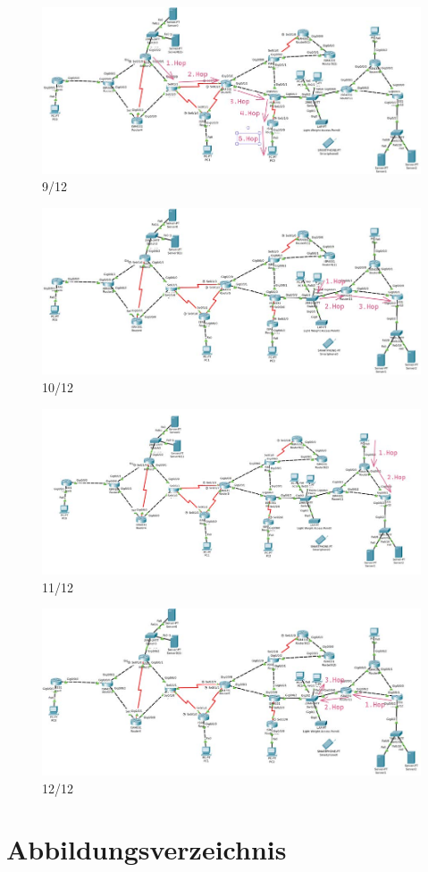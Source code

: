 \documentclass[a4paper]{article}
\begin{document}
\begin{figure}
	\centering
	\includegraphics[scale=0.5]{9.jpg}
	\caption{9/12}
\end{figure}
\begin{figure}
	\centering
	\includegraphics[scale=0.5]{10.jpg}
	\caption{10/12}
\end{figure}
\begin{figure}
	\centering
	\includegraphics[scale=0.5]{11.jpg}
	\caption{11/12}
\end{figure}
\begin{figure}
	\centering
	\includegraphics[scale=0.5]{12.jpg}
	\caption{12/12}
\end{figure}

\newpage

\section{Abbildungsverzeichnis}

\listoffigures
\end{document}
